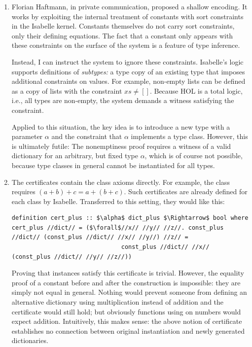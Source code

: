 \begin{enumerate}
  \item
    Florian Haftmann, in private communication, proposed a shallow encoding.
    It works by exploiting the internal treatment of constants with sort constraints in the Isabelle kernel.
    Constants themselves do not carry sort constraints, only their defining equations.
    The fact that a constant only appears with these constraints on the surface of the system is a feature of type inference.

    Instead, I can instruct the system to ignore these constraints.
    Isabelle's logic supports definitions of \emph{subtypes:}
    a type copy of an existing type that imposes additional constraints on values.
    For example, non-empty lists can be defined as a copy of lists with the constraint $\mathit{xs} \neq []$.
    Because HOL is a total logic, i.e., all types are non-empty, the system demands a witness satisfying the constraint.

    Applied to this situation, the key idea is to introduce a new type with a parameter $\alpha$ and the constraint that $\alpha$ implements a type class.
    However, this is ultimately futile:
    The nonemptiness proof requires a witness of a valid dictionary for an arbitrary, but fixed type $\alpha$, which is of course not possible, because type classes in general cannot be instantiated for all types.%
  \item
    The certificates contain the class axioms directly.
    For example, the  class requires $(a + b) + c = a + (b + c)$.
    Such certificates are already defined for each class by Isabelle.
    Transferred to this setting, they would like this:
    \begin{lstlisting}[language=Isabelle]
definition cert_plus :: $\alpha$ dict_plus $\Rightarrow$ bool where
cert_plus //dict// = ($\forall$//x// //y// //z//. const_plus //dict// (const_plus //dict// //x// //y//) //z// =
                               const_plus //dict// //x// (const_plus //dict// //y// //z//))\end{lstlisting}
    Proving that instances satisfy this certificate is trivial.
    However, the equality proof of a constant before and after the construction is impossible: they are simply not equal in general.
    Nothing would prevent someone from defining an alternative dictionary using multiplication instead of addition and the certificate would still hold; but obviously functions using  on numbers would expect addition.
    Intuitively, this makes sense: the above notion of certificate establishes no connection between original instantiation and newly generated dictionaries.


\end{enumerate}
